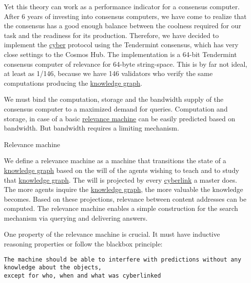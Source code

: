 \documentclass[8pt,oneside]{amsart}
\makeatletter
\newcommand{\linkred}[2]{\href{#1}{\color{red}{#2}}}
\newcommand{\linkgreen}[2]{\href{#1}{\color{green}{#2}}}
\renewcommand\subsection{\@startsection{subsection}
                                    {2}{\z@}
                                    {-3.25ex\@plus -1ex \@minus -.2ex}
                                    {0ex \@plus .2ex}
                                    {\play\Large}
                        }
\newcommand{\titleSection}[1]{\subsection{#1}}
\makeatother
\begin{document}
Yet this theory can work as a performance indicator for a consensus computer. After 6 years of investing into consensus computers, we have come to realize that the \linkgreen{https://ipfs.io/ipfs/QmaMtD7xDgghqgjN62zWZ5TBGFiEjGQtuZBjJ9sMh816KJ}{Tendermint} consensus has a good enough balance between the coolness required for our task and the readiness for its production. Therefore, we have decided to implement the {\hyperref[cyber]{cyber}} protocol using the Tendermint consensus, which has very close settings to the Cosmos Hub. The \linkred{https://github.com/cybercongress/go-cyber}{go-cyber} implementation is a 64-bit Tendermint consensus computer of relevance for 64-byte string-space. This is by far not ideal, at least as 1/146, because we have 146 validators who verify the same computations producing the {\hyperref[knowledge-graph]{knowledge graph}}.

We must bind the computation, storage and the bandwidth supply of the consensus computer to a maximized demand for queries. Computation and storage, in case of a basic {\hyperref[relevance-machine]{relevance machine}} can be easily predicted based on bandwidth. But bandwidth requires a limiting mechanism.

\titleSection{Relevance machine}\label{relevance-machine}

We define a relevance machine as a machine that transitions the state of a {\hyperref[knowledge-graph]{knowledge graph}} based on the will of the agents wishing to teach and to study that {\hyperref[knowledge-graph]{knowledge graph}}. The will is projected by every {\hyperref[cyberlinks]{cyberlink}} a master does. The more agents inquire the {\hyperref[knowledge-graph]{knowledge graph}}, the more valuable the knowledge becomes. Based on these projections, relevance between content addresses can be computed. The relevance machine enables a simple construction for the search mechanism via querying and delivering answers.

One property of the relevance machine is crucial. It must have inductive reasoning properties or follow the blackbox principle:

\begin{lstlisting}
The machine should be able to interfere with predictions without any knowledge about the objects,
except for who, when and what was cyberlinked
\end{lstlisting}
\end{document}
